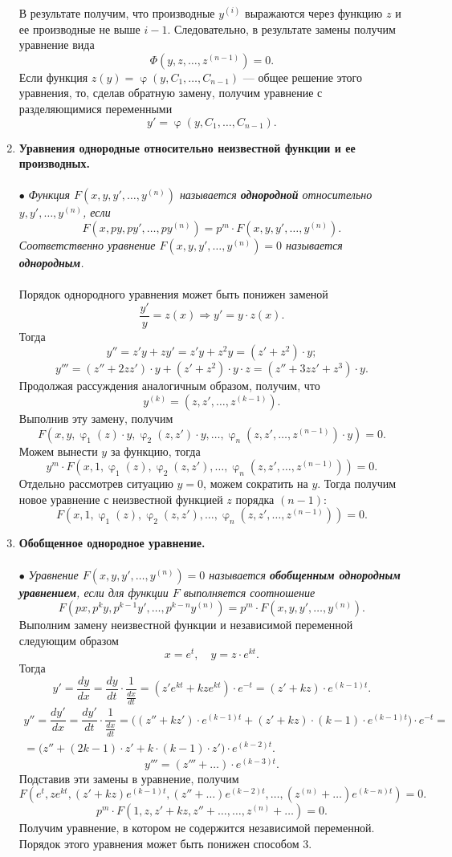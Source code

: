 \documentclass[a4paper, 12pt]{report}
\newcommand{\FI}{\Phi}
\renewcommand{\varphi}{\upvarphi}
\begin{document}
\begin{enumerate}
 В результате получим, что производные $y^{(i)}$ выражаются через функцию $z$ и ее производные не выше $i-1$. Следовательно, в результате замены получим уравнение вида $$\FI(y,z,\ldots, z^{(n-1)}) = 0.$$
 Если функция $z(y) = \varphi(y, C_1,\ldots, C_{n-1})$ --- общее решение этого уравнения, то, сделав обратную замену, получим уравнение с разделяющимися переменными $$y' =  \varphi(y, C_1,\ldots, C_{n-1}).$$
 \item \textbf{Уравнения однородные относительно неизвестной функции и ее производных.}\\\\
 $\bullet$ \textit{Функция $F(x,y,y',\ldots, y^{(n)})$ называется \textbf{однородной} относительно $y,y',\ldots, y^{(n)}$, если $$F(x,py,py',\ldots, py^{(n)}) = p^m\cdot F(x,y,y',\ldots, y^{(n)}).$$ Соответственно уравнение $F(x,y,y',\ldots, y^{(n)}) = 0$ называется \textbf{однородным}.}\\\\
 Порядок однородного уравнения может быть понижен заменой $$\dfrac{y'}{y} = z(x) \Rightarrow y' = y\cdot z(x).$$
 Тогда $$y'' = z'y + zy' = z'y + z^2 y = (z' + z^2)\cdot y;$$
 $$y''' = (z'' + 2zz')\cdot y + (z' + z^2)\cdot y \cdot z = (z'' + 3zz' + z^3)\cdot y.$$
Продолжая рассуждения аналогичным образом, получим, что $$y^{(k)} = (z,z',\ldots, z^{(k-1)}).$$
Выполнив эту замену, получим $$F(x,y,\varphi_1(z)\cdot y, \varphi_2(z,z')\cdot y,\ldots, \varphi_n(z,z',\ldots, z^{(n-1)})\cdot y) = 0.$$
Можем вынести $y$ за функцию, тогда $$y^m\cdot F(x,1, \varphi_1(z), \varphi_2(z,z'),\ldots, \varphi_n(z,z',\ldots, z^{(n-1)})) = 0.$$
Отдельно рассмотрев ситуацию $y= 0 $, можем сократить на $y$. Тогда получим новое уравнение с неизвестной функцией $z$ порядка $(n-1)$:$$F(x,1, \varphi_1(z), \varphi_2(z,z'),\ldots, \varphi_n(z,z',\ldots, z^{(n-1)})) = 0.$$ 
\item \textbf{Обобщенное однородное уравнение.}\\\\
$\bullet$ \textit{Уравнение $F(x, y, y',\ldots, y^{(n)}) = 0$ называется \textbf{обобщенным однородным уравнением}, если для функции $F$ выполняется соотношение} $$F(px, p^ky , p^{k-1}y',\ldots, p^{k-n}y^{(n)}) = p^m\cdot F(x, y, y',\ldots, y^{(n)}).$$
Выполним замену неизвестной функции и независимой переменной следующим образом $$x = e^t,\quad y = z\cdot e^{kt}.$$
Тогда $$y' = \dfrac{dy}{dx} = \dfrac{dy}{dt}\cdot \dfrac{1}{\frac{dx}{dt}} = (z'e^{kt} + k ze^{kt})\cdot e^{-t} = (z' + kz)\cdot e^{(k-1)t}.$$
\begin{multline*}
	y'' = \dfrac{dy'}{dx} = \dfrac{dy'}{dt}\cdot \dfrac{1}{\frac{dx}{dt}} = \Big( (z'' + kz')\cdot e^{(k-1)t} + (z' + kz)\cdot (k-1)\cdot e^{(k-1)t}\Big)\cdot e^{-t}=\\ = \Big(z'' + (2k - 1)\cdot z' + k\cdot (k-1)\cdot z'\Big)\cdot e^{(k-2)t}.
\end{multline*}
$$y''' = (z''' + \ldots)\cdot e^{(k-3)t}.$$
Подставив эти замены в уравнение, получим $$F(e^t, ze^{kt}, (z'+kz)e^{(k-1)t}, (z'' + \ldots)e^{(k-2)t},\ldots, (z^{(n)}+\ldots)e^{(k-n)t}) = 0.$$
$$p^m \cdot F(1,z, z'+kz, z'' + \ldots, \ldots, z^{(n)}+\ldots) = 0.$$
Получим уравнение, в котором не содержится независимой переменной. Порядок этого уравнения может быть понижен способом 3.
\end{enumerate}
\end{document}
